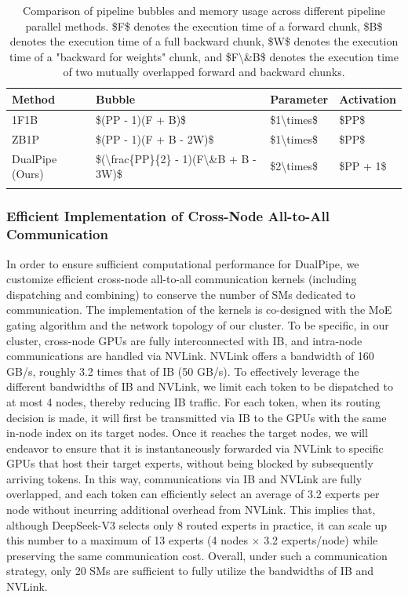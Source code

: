 \documentclass[11pt,a4paper]{article}
\begin{document}
\begin{table}[h]
\caption{Comparison of pipeline bubbles and memory usage across different pipeline parallel methods.  \$F\$  denotes the execution time of a forward chunk,  \$B\$  denotes the execution time of a full backward chunk,  \$W\$  denotes the execution time of a "backward for weights" chunk, and  \$F\textbackslash{}\&B\$  denotes the execution time of two mutually overlapped forward and backward chunks.}
\begin{tabular}{|l|l|l|l|}
\hline
Method & Bubble & Parameter & Activation \\ \hline
1F1B & \$(PP - 1)(F + B)\$ & \$1\textbackslash{}times\$ & \$PP\$ \\ \hline
ZB1P & \$(PP - 1)(F + B - 2W)\$ & \$1\textbackslash{}times\$ & \$PP\$ \\ \hline
DualPipe (Ours) & \$(\textbackslash{}frac\{PP\}\{2\} - 1)(F\textbackslash{}\&B + B - 3W)\$ & \$2\textbackslash{}times\$ & \$PP + 1\$ \\ \hline
 &  &  &  \\ \hline
\end{tabular}
\end{table}

\subsubsection{Efficient Implementation of Cross-Node All-to-All Communication}

In order to ensure sufficient computational performance for DualPipe, we customize efficient cross-node all-to-all communication kernels (including dispatching and combining) to conserve the number of SMs dedicated to communication. The implementation of the kernels is co-designed with the MoE gating algorithm and the network topology of our cluster. To be specific, in our cluster, cross-node GPUs are fully interconnected with IB, and intra-node communications are handled via NVLink. NVLink offers a bandwidth of 160 GB/s, roughly 3.2 times that of IB (50 GB/s). To effectively leverage the different bandwidths of IB and NVLink, we limit each token to be dispatched to at most 4 nodes, thereby reducing IB traffic. For each token, when its routing decision is made, it will first be transmitted via IB to the GPUs with the same in-node index on its target nodes. Once it reaches the target nodes, we will endeavor to ensure that it is instantaneously forwarded via NVLink to specific GPUs that host their target experts, without being blocked by subsequently arriving tokens. In this way, communications via IB and NVLink are fully overlapped, and each token can efficiently select an average of 3.2 experts per node without incurring additional overhead from NVLink. This implies that, although DeepSeek-V3 selects only 8 routed experts in practice, it can scale up this number to a maximum of 13 experts (4 nodes  $\times$  3.2 experts/node) while preserving the same communication cost. Overall, under such a communication strategy, only 20 SMs are sufficient to fully utilize the bandwidths of IB and NVLink.
\end{document}
